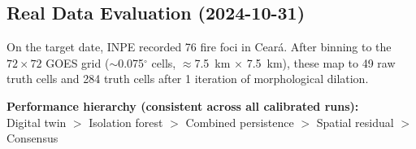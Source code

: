 \documentclass[11pt,twocolumn,a4paper]{article}
\newcommand{\abbrev}[1]{{\small\textsc{#1}}}
\begin{document}
\subsection{Real Data Evaluation (2024-10-31)}

On the target date, \abbrev{INPE} recorded 76 fire foci in Cear\'{a}. After binning to the $72\times 72$ \abbrev{GOES} grid ($\sim$0.075$^\circ$ cells, $\approx$7.5~km $\times$ 7.5~km), these map to 49 raw truth cells and 284 truth cells after 1 iteration of morphological dilation.

\begin{table}[htbp]
\centering
\caption{Real data evaluation against 76 \abbrev{INPE} foci (2024-10-31).}
\label{tab:real}
\small
{}
\end{table}

\textbf{Performance hierarchy (consistent across all calibrated runs):}\\
Digital twin $>$ Isolation forest $>$ Combined persistence $>$ Spatial residual $>$ Consensus
\end{document}

